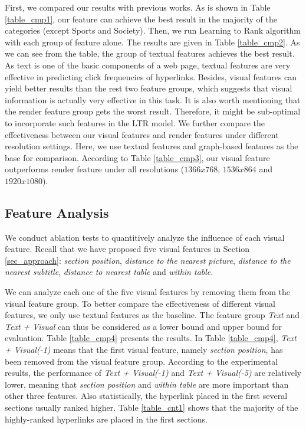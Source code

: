 First, we compared our results with previous works. As is shown in Table \ref{table_cmp1}, our feature can achieve the best result in the majority of the categories (except Sports and Society). Then, we run Learning to Rank algorithm with each group of feature alone. The results are given in Table \ref{table_cmp2}. As we can see from the table, the group of textual features achieves the best result. As text is one of the basic components of a web page, textual features are very effective in predicting click frequencies of hyperlinks. Besides, visual features can yield better results than the rest two feature groups, which suggests that visual information is actually very effective in this task. It is also worth mentioning that the render feature group gets the worst result. Therefore,  it might be sub-optimal to incorporate such features in the LTR model. We further compare the effectiveness between our visual features and render features under different resolution settings. Here, we use textual features and graph-based features as the base for comparison. According to Table \ref{table_cmp3}, our visual feature outperforms render feature under all resolutions ($1366x768$, $1536x864$ and $1920x1080$).

\subsection{Feature Analysis}

We conduct ablation tests to quantitively analyze the influence of each visual feature.
Recall that we have proposed five visual features in Section \ref{sec_approach}: \emph{section position}, \emph{distance to the nearest picture}, \emph{distance to the nearest subtitle}, \emph{distance to nearest table} and \emph{within table}.

We can analyze each one of the five visual features by removing them from the visual feature group. To better compare the effectiveness of different visual features, we only use textual features as the baseline. The feature group \emph{Text} and \emph{Text + Visual} can thus be considered as a lower bound and upper bound for evaluation. Table \ref{table_cmp4} presents the results. In Table \ref{table_cmp4}, \emph{Text + Visual(-1)} means that the first visual feature, namely \emph{section position}, has been removed from the visual feature group. According to the experimental results, the performance of \emph{Text + Visual(-1)} and \emph{Text + Visual(-5)} are relatively lower, meaning that \emph{section position} and \emph{within table} are more important than other three features. Also statistically, the hyperlink placed in the first several sections usually ranked higher. Table \ref{table_cnt1} shows that the majority of the highly-ranked hyperlinks are placed in the first sections.

